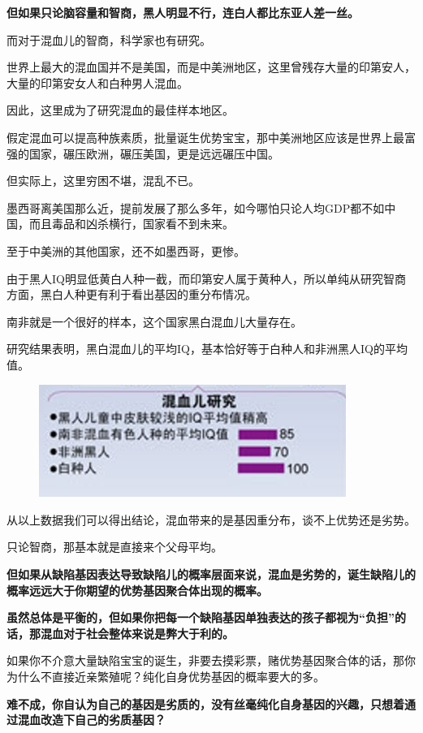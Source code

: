 \documentclass[UTF8, 11pt, oneside]{ctexart}
\newcommand{\zd}[1]{\textbf{\textcolor[RGB]{123,12,0}{#1}}} %
\begin{document}
\zd{但如果只论脑容量和智商，黑人明显不行，连白人都比东亚人差一丝。}

而对于混血儿的智商，科学家也有研究。

世界上最大的混血国并不是美国，而是中美洲地区，这里曾残存大量的印第安人，大量的印第安女人和白种男人混血。

因此，这里成为了研究混血的最佳样本地区。

假定混血可以提高种族素质，批量诞生优势宝宝，那中美洲地区应该是世界上最富强的国家，碾压欧洲，碾压美国，更是远远碾压中国。

但实际上，这里穷困不堪，混乱不已。

墨西哥离美国那么近，提前发展了那么多年，如今哪怕只论人均GDP都不如中国，而且毒品和凶杀横行，国家看不到未来。

至于中美洲的其他国家，还不如墨西哥，更惨。

由于黑人IQ明显低黄白人种一截，而印第安人属于黄种人，所以单纯从研究智商方面，黑白人种更有利于看出基因的重分布情况。

南非就是一个很好的样本，这个国家黑白混血儿大量存在。

研究结果表明，黑白混血儿的平均IQ，基本恰好等于白种人和非洲黑人IQ的平均值。

\begin{figure}[H]
    \centering
    \includegraphics[width=10cm]{2023-03-30-005}
\end{figure}

从以上数据我们可以得出结论，混血带来的是基因重分布，谈不上优势还是劣势。

只论智商，那基本就是直接来个父母平均。

\zd{但如果从缺陷基因表达导致缺陷儿的概率层面来说，混血是劣势的，诞生缺陷儿的概率远远大于你期望的优势基因聚合体出现的概率。}

\zd{虽然总体是平衡的，但如果你把每一个缺陷基因单独表达的孩子都视为“负担”的话，那混血对于社会整体来说是弊大于利的。}

如果你不介意大量缺陷宝宝的诞生，非要去摸彩票，赌优势基因聚合体的话，那你为什么不直接近亲繁殖呢？纯化自身优势基因的概率要大的多。

\zd{难不成，你自认为自己的基因是劣质的，没有丝毫纯化自身基因的兴趣，只想着通过混血改造下自己的劣质基因？}
\end{document}
